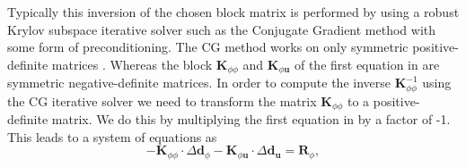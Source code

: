 Typically this inversion of the chosen block matrix is performed by using a robust Krylov subspace iterative solver such as the Conjugate Gradient method with some form of preconditioning. The CG method works on only symmetric positive-definite matrices \cite{EdwinK.P.Chong2013}. Whereas the block $\mathbf{K}_{\phi \phi}$ and $\mathbf{K}_{\phi \mathbf{u}}$ of the first equation in  are symmetric negative-definite matrices. In order to compute the inverse $\mathbf{K}_{\phi \phi}^{-1}$ using the CG iterative solver we need to transform the matrix $\mathbf{K}_{\phi \phi}$ to a positive-definite matrix. We do this by multiplying the first equation in  by a factor of -1. This leads to a system of equations as
\begin{equation}
-\mathbf{K}_{\phi \phi} \cdot \Delta \mathbf{d}_{\phi} - \mathbf{K}_{\phi \mathbf{u}} \cdot \Delta \mathbf{d}_{\mathbf{u}} = \mathbf{R}_{\phi},
\end{equation}
